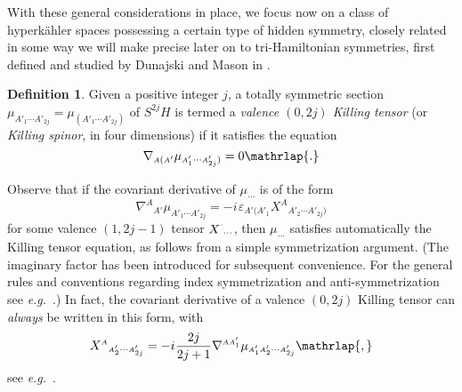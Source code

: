 \documentclass[11pt]{amsart}
\theoremstyle{remark}
\theoremstyle{remark}
\theoremstyle{definition}
\newtheorem*{definition}{Definition}
\theoremstyle{definition}
\theoremstyle{definition}
\newcommand{\0}{{\scriptstyle 0'}} %
\newcommand{\1}{{\scriptstyle 1'}}
\newcommand{\A}{{\scriptscriptstyle A}} %
\newcommand{\pt}{\hspace{1pt}} %
\newcommand{\hp}{\hspace{0.5pt}} %
\begin{document}
With these general considerations in place, we focus now on a class of hyperk\"ahler spaces possessing a certain type of hidden symmetry, closely related in some way we will make precise later on to tri-Hamiltonian symmetries, first defined and studied by Dunajski and Mason in \cite{MR1785432, MR2006758}.


\begin{definition}
Given a positive integer $j$, a totally symmetric section $\mu_{\A'_1\cdots\A'_{2j}} = \mu_{(\A'_1\cdots\A'_{2j})}$ of $S^{2j}H$ is termed a \textit{valence $(0,2j)$ Killing tensor} (or \textit{Killing spinor}, in four dimensions) if it satisfies the equation
\begin{equation} \label{(0,2j)_Killing_sp_eq}
\nabla_{\A(\A'} \mu_{\A'_1 \cdots \A'_{2j})} = 0 \mathrlap{.}
\end{equation}
\end{definition}

Observe that if the covariant derivative of $\mu_{\pt \cdots}$ is of the form
\begin{equation} \label{nabla_mu}
\nabla^{\A}{}_{\A'} \mu_{\A'_1\cdots\A'_{2j}} = - i \pt \varepsilon_{\A'(\A'_1} X^{\A}{}_{\A'_2\cdots\A'_{2j})}
\end{equation}
for some valence $(1,2j-1)$ tensor $X^{\hp ^{.}}{}_{\!\cdots}$, then $\mu_{\pt \cdots}$ satisfies automatically the Killing tensor equation, as follows from a simple symmetrization argument. (The imaginary factor has been introduced for subsequent convenience. For the general rules and conventions regarding index symmetrization and anti-symmetrization see \textit{e.g.}~\cite[p.132 \& ff.]{MR776784}.) In fact, the covariant derivative of a valence $(0,2j)$ Killing tensor can \textit{always} be written in this form, with
\begin{equation}
X^{\A}{}_{\A'_2\cdots\A'_{2j}} = - i \hp \frac{2j}{2j+1} \nabla^{\A\A'_1} \mu_{\A'_1\A'_2\cdots \A'_{2j}} \mathrlap{,}
\end{equation}
see \textit{e.g.}~\cite[eqs.~(2.8) through (3.1), with the last one needing an obvious correction]{MR0425802}. 
\end{document}
